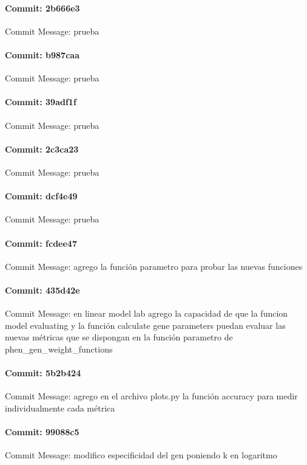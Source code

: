 \documentclass{article}
\begin{document}
\paragraph{Commit: 2b666e3}
Commit Message: prueba

\paragraph{Commit: b987caa}
Commit Message: prueba

\paragraph{Commit: 39adf1f}
Commit Message: prueba

\paragraph{Commit: 2c3ca23}
Commit Message: prueba

\paragraph{Commit: dcf4e49}
Commit Message: prueba

\paragraph{Commit: fcdee47}
Commit Message: agrego la función parametro para probar las nuevas funciones

\paragraph{Commit: 435d42e}
Commit Message: en linear model lab agrego la capacidad de que la funcion model evaluating y la función calculate gene parameters puedan evaluar las nuevas métricas que se dispongan en la función parametro de phen_gen_weight_functions

\paragraph{Commit: 5b2b424}
Commit Message: agrego en el archivo plots.py la función accuracy para medir individualmente cada métrica

\paragraph{Commit: 99088c5}
Commit Message: modifico especificidad del gen poniendo k en logaritmo
\end{document}
